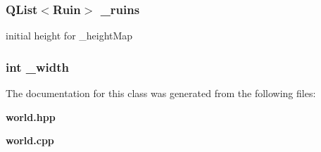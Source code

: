 \subsubsection{\setlength{\rightskip}{0pt plus 5cm}QList$<${\bf Ruin}$>$ {\bf \_\-ruins}\hspace{0.3cm}{\tt  [protected]}}\label{classWorld_p6}


initial height for \_\-height\-Map 

\subsubsection{\setlength{\rightskip}{0pt plus 5cm}int {\bf \_\-width}\hspace{0.3cm}{\tt  [protected]}}\label{classWorld_p1}




The documentation for this class was generated from the following files:\begin{CompactItemize}
\item 
{\bf world.hpp}\item 
{\bf world.cpp}\end{CompactItemize}
